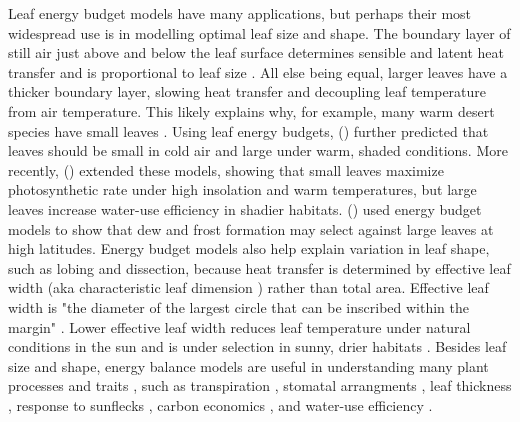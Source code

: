 \documentclass[11pt, oneside]{article}
\begin{document}
Leaf energy budget models have many applications, but perhaps their most widespread use is in modelling optimal leaf size and shape. The boundary layer of still air just above and below the leaf surface determines sensible and latent heat transfer and is proportional to leaf size \citep{Gates_1968}. All else being equal, larger leaves have a thicker boundary layer, slowing heat transfer and decoupling leaf temperature from air temperature. This likely explains why, for example, many warm desert species have small leaves \citep{Gibson_1998}. Using leaf energy budgets, \citeauthor{Parkhurst_Loucks_1972} (\citeyear{Parkhurst_Loucks_1972}) further predicted that leaves should be small in cold air and large under warm, shaded conditions. More recently, \citeauthor{Okajima_etal_2012} (\citeyear{Okajima_etal_2012}) extended these models, showing that small leaves maximize photosynthetic rate under high insolation and warm temperatures, but large leaves increase water-use efficiency in shadier habitats. \citeauthor{Wright_etal_2017} (\citeyear{Wright_etal_2017}) used energy budget models to show that dew and frost formation may select against large leaves at high latitudes. Energy budget models also help explain variation in leaf shape, such as lobing and dissection, because heat transfer is determined by effective leaf width (aka characteristic leaf dimension \citep{Taylor_1975}) rather than total area. Effective leaf width is "the diameter of the largest circle that can be inscribed within the margin" \citep{Leigh_etal_2017}. Lower effective leaf width reduces leaf temperature under natural conditions in the sun \citep{Leigh_etal_2017} and is under selection in sunny, drier habitats \citep{Ferris_etal_2015}. Besides leaf size and shape, energy balance models are useful in understanding many plant processes and traits \citep{Gates_1965}, such as transpiration \citep{Gates_1968}, stomatal arrangments \citep{Foster_Smith_1986}, leaf thickness \citep{Leigh_etal_2012}, response to sunflecks \citep{Schymanski_etal_2013}, carbon economics \citep{Michaletz_etal_2016}, and water-use efficiency \citep{Schymanski_Or_2016}. 
\end{document}
